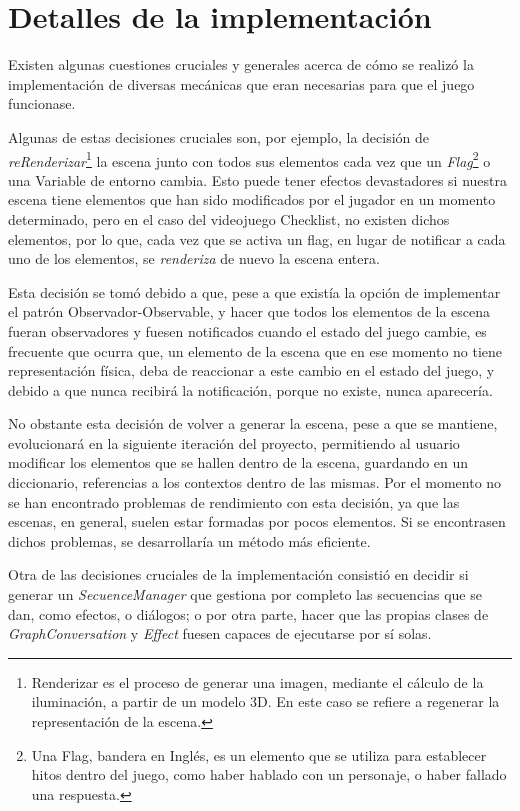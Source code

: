 \section{Detalles de la implementación}

Existen algunas cuestiones cruciales y generales acerca de cómo se realizó la implementación de diversas mecánicas que eran necesarias para que el juego funcionase.

Algunas de estas decisiones cruciales son, por ejemplo, la decisión de \textit{reRenderizar}\footnote{Renderizar es el proceso de generar una imagen, mediante el cálculo de la iluminación, a partir de un modelo 3D. En este caso se refiere a regenerar la representación de la escena.} la escena junto con todos sus elementos cada vez que un \textit{Flag}\footnote{Una Flag, bandera en Inglés, es un elemento que se utiliza para establecer hitos dentro del juego, como haber hablado con un personaje, o haber fallado una respuesta.} o una Variable de entorno cambia. Esto puede tener efectos devastadores si nuestra escena tiene elementos que han sido modificados por el jugador en un momento determinado, pero en el caso del videojuego Checklist, no existen dichos elementos, por lo que, cada vez que se activa un flag, en lugar de notificar a cada uno de los elementos, se \textit{renderiza} de nuevo la escena entera.

Esta decisión se tomó debido a que, pese a que existía la opción de implementar el patrón Observador-Observable, y hacer que todos los elementos de la escena fueran observadores y fuesen notificados cuando el estado del juego cambie, es frecuente que ocurra que, un elemento de la escena que en ese momento no tiene representación física, deba de reaccionar a este cambio en el estado del juego, y debido a que nunca recibirá la notificación, porque no existe, nunca aparecería.

No obstante esta decisión de volver a generar la escena, pese a que se mantiene, evolucionará en la siguiente iteración del proyecto, permitiendo al usuario modificar los elementos que se hallen dentro de la escena, guardando en un diccionario, referencias a los contextos dentro de las mismas. Por el momento no se han encontrado problemas de rendimiento con esta decisión, ya que las escenas, en general, suelen estar formadas por pocos elementos. Si se encontrasen dichos problemas, se desarrollaría un método más eficiente.

Otra de las decisiones cruciales de la implementación consistió en decidir si generar un \textit{SecuenceManager} que gestiona por completo las secuencias que se dan, como efectos, o diálogos; o por otra parte, hacer que las propias clases de \textit{GraphConversation} y \textit{Effect} fuesen capaces de ejecutarse por sí solas.

